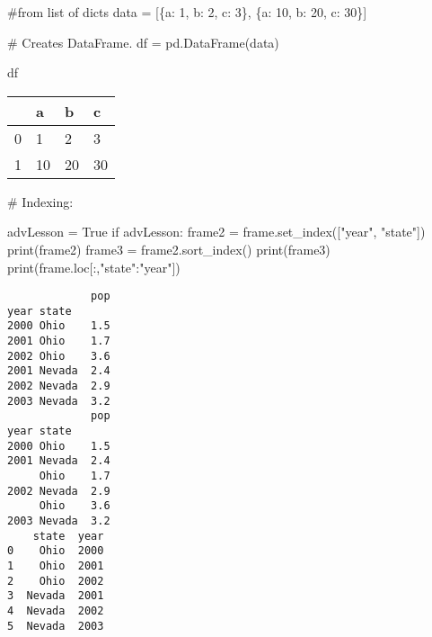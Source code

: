 \documentclass[
  letterpaper,
  DIV=11,
  numbers=noendperiod]{scrreprt}
\newenvironment{Shaded}{\begin{snugshade}}{\end{snugshade}}
\newcommand{\BuiltInTok}[1]{\textcolor[rgb]{0.00,0.23,0.31}{#1}}
\newcommand{\CommentTok}[1]{\textcolor[rgb]{0.37,0.37,0.37}{#1}}
\newcommand{\ControlFlowTok}[1]{\textcolor[rgb]{0.00,0.23,0.31}{#1}}
\newcommand{\DecValTok}[1]{\textcolor[rgb]{0.68,0.00,0.00}{#1}}
\newcommand{\NormalTok}[1]{\textcolor[rgb]{0.00,0.23,0.31}{#1}}
\newcommand{\OperatorTok}[1]{\textcolor[rgb]{0.37,0.37,0.37}{#1}}
\newcommand{\StringTok}[1]{\textcolor[rgb]{0.13,0.47,0.30}{#1}}
\newcommand{\VariableTok}[1]{\textcolor[rgb]{0.07,0.07,0.07}{#1}}
\begin{document}
\begin{Shaded}
\begin{Highlighting}[]
\CommentTok{\#from list of dicts}
\NormalTok{data }\OperatorTok{=}\NormalTok{ [\{}\StringTok{\textquotesingle{}a\textquotesingle{}}\NormalTok{: }\DecValTok{1}\NormalTok{, }\StringTok{\textquotesingle{}b\textquotesingle{}}\NormalTok{: }\DecValTok{2}\NormalTok{, }\StringTok{\textquotesingle{}c\textquotesingle{}}\NormalTok{: }\DecValTok{3}\NormalTok{\},}
\NormalTok{        \{}\StringTok{\textquotesingle{}a\textquotesingle{}}\NormalTok{: }\DecValTok{10}\NormalTok{, }\StringTok{\textquotesingle{}b\textquotesingle{}}\NormalTok{: }\DecValTok{20}\NormalTok{, }\StringTok{\textquotesingle{}c\textquotesingle{}}\NormalTok{: }\DecValTok{30}\NormalTok{\}]}
  
\CommentTok{\# Creates DataFrame.}
\NormalTok{df }\OperatorTok{=}\NormalTok{ pd.DataFrame(data)}
  
\NormalTok{df}
\end{Highlighting}
\end{Shaded}

\begin{longtable}[]{@{}llll@{}}
\toprule()
& a & b & c \\
\midrule()
\endhead
0 & 1 & 2 & 3 \\
1 & 10 & 20 & 30 \\
\bottomrule()
\end{longtable}

\begin{Shaded}
\begin{Highlighting}[]
\CommentTok{\# Indexing:}

\NormalTok{advLesson }\OperatorTok{=} \VariableTok{True}
\ControlFlowTok{if}\NormalTok{ advLesson:}
\NormalTok{    frame2 }\OperatorTok{=}\NormalTok{ frame.set\_index([}\StringTok{"year"}\NormalTok{, }\StringTok{"state"}\NormalTok{])}
    \BuiltInTok{print}\NormalTok{(frame2)}
\NormalTok{    frame3 }\OperatorTok{=}\NormalTok{ frame2.sort\_index()}
    \BuiltInTok{print}\NormalTok{(frame3)}
    \BuiltInTok{print}\NormalTok{(frame.loc[:,}\StringTok{"state"}\NormalTok{:}\StringTok{"year"}\NormalTok{])}
\end{Highlighting}
\end{Shaded}

\begin{verbatim}
             pop
year state      
2000 Ohio    1.5
2001 Ohio    1.7
2002 Ohio    3.6
2001 Nevada  2.4
2002 Nevada  2.9
2003 Nevada  3.2
             pop
year state      
2000 Ohio    1.5
2001 Nevada  2.4
     Ohio    1.7
2002 Nevada  2.9
     Ohio    3.6
2003 Nevada  3.2
    state  year
0    Ohio  2000
1    Ohio  2001
2    Ohio  2002
3  Nevada  2001
4  Nevada  2002
5  Nevada  2003
\end{verbatim}
\end{document}
